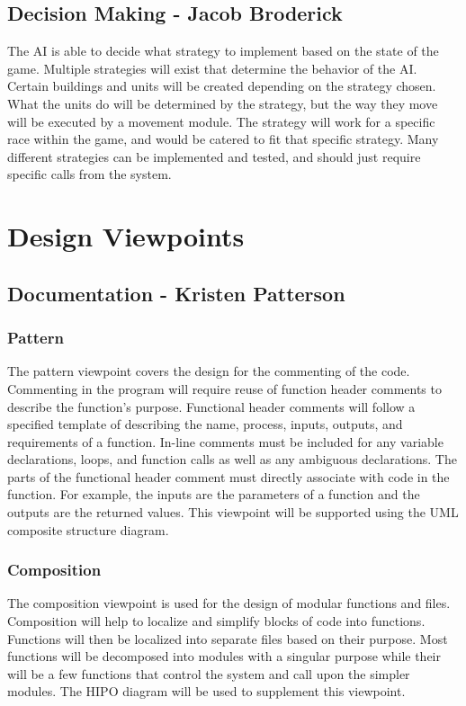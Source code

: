 \subsection{Decision Making - Jacob Broderick}
The AI is able to decide what strategy to implement based on the state of the game. Multiple strategies will exist that determine the behavior of the AI. Certain buildings and units will be created depending on the strategy chosen. What the units do will be determined by the strategy, but the way they move will be executed by a movement module. The strategy will work for a specific race within the game, and would be catered to fit that specific strategy. Many different strategies can be implemented and tested, and should just require specific calls from the system.
\section{Design Viewpoints}
\subsection{Documentation - Kristen Patterson}
\subsubsection{Pattern}
	The pattern viewpoint covers the design for the commenting of the code. Commenting in the program will require reuse of function header comments to describe the function's purpose. Functional header comments will follow a specified template of describing the name, process, inputs, outputs, and requirements of a function. In-line comments must be included for any variable declarations, loops, and function calls as well as any ambiguous declarations. The parts of the functional header comment must directly associate with code in the function. For example, the inputs are the parameters of a function and the outputs are the returned values. This viewpoint will be supported using the UML composite structure diagram.
	
\subsubsection{Composition}
	The composition viewpoint is used for the design of modular functions and files. Composition will help to localize and simplify blocks of code into functions. Functions will then be localized into separate files based on their purpose. Most functions will be decomposed into modules with a singular purpose while their will be a few functions that control the system and call upon the simpler modules. The HIPO diagram will be used to supplement this viewpoint.

